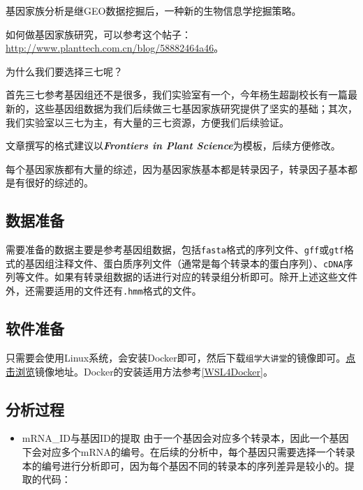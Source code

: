 \documentclass[
  10pt,
]{book}
\providecommand{\tightlist}{%
  \setlength{\itemsep}{0pt}\setlength{\parskip}{0pt}}
\begin{document}
基因家族分析是继GEO数据挖掘后，一种新的生物信息学挖掘策略。

如何做基因家族研究，可以参考这个帖子：\url{http://www.planttech.com.cn/blog/58882464a46}。

为什么我们要选择三七呢？

首先三七参考基因组还不是很多，我们实验室有一个，今年杨生超副校长有一篇最新的，这些基因组数据为我们后续做三七基因家族研究提供了坚实的基础；其次，我们实验室以三七为主，有大量的三七资源，方便我们后续验证。

文章撰写的格式建议以\textbf{\emph{Frontiers in Plant Science}}为模板，后续方便修改。

每个基因家族都有大量的综述，因为基因家族基本都是转录因子，转录因子基本都是有很好的综述的。

\hypertarget{ux6570ux636eux51c6ux5907}{%
\subsection{数据准备}\label{ux6570ux636eux51c6ux5907}}

需要准备的数据主要是参考基因组数据，包括\texttt{fasta}格式的序列文件、\texttt{gff}或\texttt{gtf}格式的基因组注释文件、蛋白质序列文件（通常是每个转录本的蛋白序列）、\texttt{cDNA}序列等文件。如果有转录组数据的话进行对应的转录组分析即可。除开上述这些文件外，还需要适用的文件还有\texttt{.hmm}格式的文件。

\hypertarget{ux8f6fux4ef6ux51c6ux5907}{%
\subsection{软件准备}\label{ux8f6fux4ef6ux51c6ux5907}}

只需要会使用Linux系统，会安装Docker即可，然后下载\texttt{组学大讲堂}的镜像即可。\href{https://hub.docker.com/r/omicsclass/gene-family}{点击浏览}镜像地址。Docker的安装适用方法参考\ref{WSL4Docker}。

\hypertarget{ux5206ux6790ux8fc7ux7a0b}{%
\subsection{分析过程}\label{ux5206ux6790ux8fc7ux7a0b}}

\begin{itemize}
\tightlist
\item
  mRNA\_ID与基因ID的提取
  由于一个基因会对应多个转录本，因此一个基因下会对应多个mRNA的编号。在后续的分析中，每个基因只需要选择一个转录本的编号进行分析即可，因为每个基因不同的转录本的序列差异是较小的。提取的代码：
\end{itemize}
\end{document}
